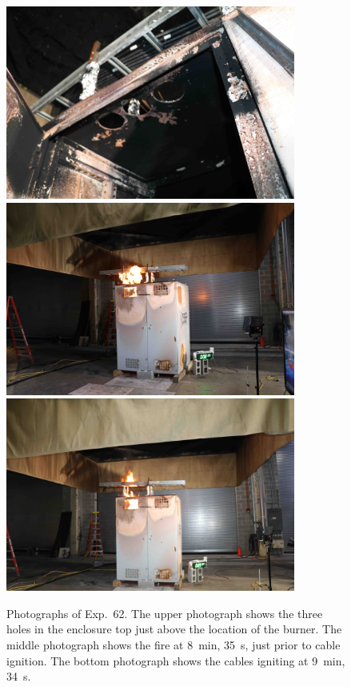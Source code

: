 \begin{figure}[p]
\centering
\includegraphics[height=2.50in]{../FIGURES/Test_62_cables} \\ \vspace{0.1in}
\includegraphics[height=2.50in]{../FIGURES/Test_62_8_min_35_s} \\ \vspace{0.1in}
\includegraphics[height=2.50in]{../FIGURES/Test_62_9_min_34_s}
\caption[Photographs of Exp.~62]{Photographs of Exp.~62. The upper photograph shows the three holes in the enclosure top just above the location of the burner. The middle photograph shows the fire at 8~min, 35~s, just prior to cable ignition. The bottom photograph shows the cables igniting at 9~min, 34~s.}
\label{fig:Test_62_photos}
\end{figure}


